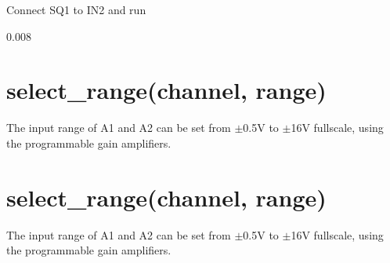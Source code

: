 \documentclass[a4paper,12pt,english]{sphinxmanual}
\begin{document}
Connect SQ1 to IN2 and run

\begin{sphinxVerbatim}[commandchars=\\\{\}]
  
\end{sphinxVerbatim}

0.008


\section{select\_range(channel, range)}
\label{\detokenize{7.1:select-range-channel-range}}
The input range of A1 and A2 can be set from \(\pm\)0.5V to \(\pm\)16V
fullscale, using the programmable gain amplifiers.

\begin{sphinxVerbatim}[commandchars=\\\{\}]
          
          
\end{sphinxVerbatim}


\section{select\_range(channel, range)}
\label{\detokenize{7.1:id1}}
The input range of A1 and A2 can be set from \(\pm\)0.5V to \(\pm\)16V
fullscale, using the programmable gain amplifiers.

\begin{sphinxVerbatim}[commandchars=\\\{\}]
          
          
\end{sphinxVerbatim}
\end{document}
